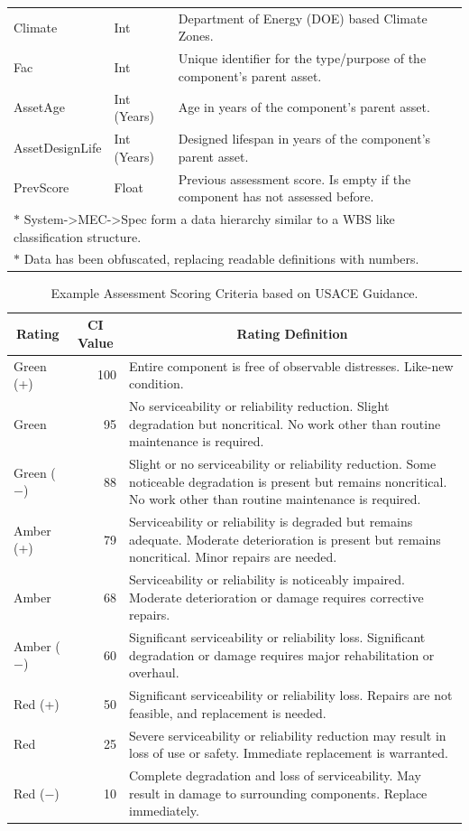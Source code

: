 \documentclass[NewProceedings,letterpaper,NoPageNumbers,NoLineNumbers, DoubleSpace]{ascelike-new}
\begin{document}
\begin{table}
\begin{tabular}{l l p{3.2in}}
Climate & Int & Department of Energy (DOE) based Climate Zones. \\
Fac & Int & Unique identifier for the type/purpose of the component's parent asset. \\
AssetAge & Int (Years) & Age in years of the component's parent asset. \\
AssetDesignLife & Int (Years) & Designed lifespan in years of the component's parent asset. \\
PrevScore & Float & Previous assessment score. Is empty if the component has not assessed before. \\
\hline
\multicolumn{3}{l}{$\ast$ System->MEC->Spec form a data hierarchy similar to a WBS like classification structure.} \\
\multicolumn{3}{l}{$\ast$ Data has been obfuscated, replacing readable definitions with numbers.} \\
\hline\hline
\end{tabular}
\normalsize
\end{table}

\begin{table}
\caption{Example Assessment Scoring Criteria based on USACE Guidance.}
\label{table:AssessmentScores}
\centering
\small
\renewcommand{\arraystretch}{1.25}
\begin{tabular}{l r p{3.5in}}
\hline\hline
\multicolumn{1}{c}{Rating} &
\multicolumn{1}{c}{CI Value} &
\multicolumn{1}{c}{Rating Definition} \\
\hline
Green (+) & 100 & Entire component is free of observable distresses. Like-new condition. \\
Green & 95 & No serviceability or reliability reduction. Slight degradation but noncritical. No work other than routine maintenance is required. \\
Green ($-$) & 88 & Slight or no serviceability or reliability reduction. Some noticeable degradation is present but remains noncritical. No work other than routine maintenance is required. \\
Amber (+) & 79 & Serviceability or reliability is degraded but remains adequate. Moderate deterioration is present but remains noncritical. Minor repairs are needed. \\
Amber & 68 & Serviceability or reliability is noticeably impaired. Moderate deterioration or damage requires corrective repairs. \\
Amber ($-$) & 60 & Significant serviceability or reliability loss. Significant degradation or damage requires major rehabilitation or overhaul. \\
Red (+) & 50 & Significant serviceability or reliability loss. Repairs are not feasible, and replacement is needed. \\
Red & 25 & Severe serviceability or reliability reduction may result in loss of use or safety. Immediate replacement is warranted. \\
Red ($-$) & 10 & Complete degradation and loss of serviceability. May result in damage to surrounding components. Replace immediately. \\
\hline\hline
\end{tabular}
\normalsize
\end{table}
\end{document}
